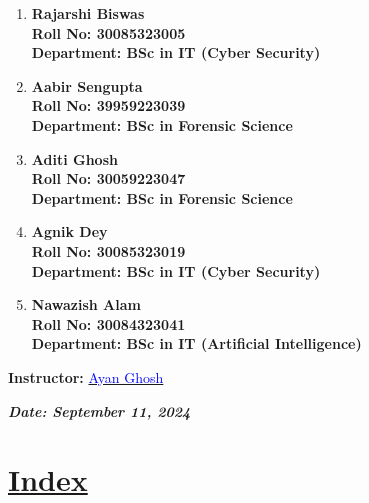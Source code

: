 \documentclass[a4paper,12pt]{article}
\begin{document}
\begin{titlepage}
    \normalsize
    \begin{enumerate}
        \item \textbf{Rajarshi Biswas}\\
              \textbf{Roll No: 30085323005}\\
              \textbf{Department: BSc in IT (Cyber Security)}
        \item \textbf{Aabir Sengupta }\\
              \textbf{Roll No: 39959223039}\\
              \textbf{Department: BSc in Forensic Science}
        \item \textbf{Aditi Ghosh}\\
              \textbf{Roll No: 30059223047}\\
              \textbf{Department: BSc in Forensic Science}
        \item \textbf{Agnik Dey}\\
              \textbf{Roll No: 30085323019}\\
              \textbf{Department: BSc in IT (Cyber Security)}
        \item \textbf{Nawazish Alam}\\
              \textbf{Roll No: 30084323041}\\
              \textbf{Department: BSc in IT (Artificial Intelligence)}
    \end{enumerate}
    \vspace{0.8 cm}
    
    \textbf{Instructor:} \href{mailto:ayan.ghosh@university.edu}{\textcolor{blue}{Ayan Ghosh}}\\
    \vspace{0.2cm}
    
    \textbf{\textit{Date: September 11, 2024}}

\end{titlepage}
\newpage
{}
\vspace{-2cm}

\centering
\section*{\underline{\Huge\textbf{\textcolor{blue!60}{Index}}}}
\vspace{0.5cm}
\end{document}
